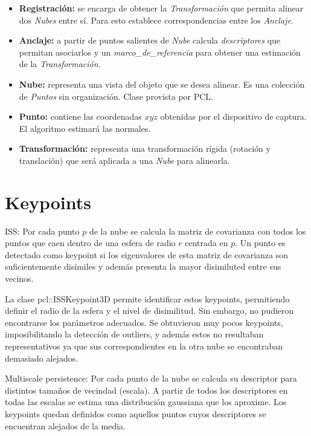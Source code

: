 		\begin{itemize}
			\item {\bfseries Registración:} se encarga de obtener la \emph{Transformación} que
				permita alinear dos \emph{Nubes} entre sí.  Para esto establece
				correspondencias entre los \emph{Anclaje}.
			\item {\bfseries Anclaje:} a partir de puntos salientes de \emph{Nube} calcula
				\emph{descriptores}  que permitan asociarlos y un
				\emph{marco\_de\_referencia} para obtener una estimación de la
				\emph{Transformación}.
			\item {\bfseries Nube:} representa una vista del objeto que se desea alinear.
				Es una colección de \emph{Puntos} sin organización. Clase
				provista por PCL.
			\item {\bfseries Punto:} contiene las coordenadas $xyz$ obtenidas por el
				dispositivo de captura. El algoritmo estimará las normales.
			\item {\bfseries Transformación:} representa una transformación rígida
				(rotación y translación) que será aplicada a una \emph{Nube}
				para alinearla.
		\end{itemize}

	\section{Keypoints}
		ISS:
		Por cada punto $p$ de la nube se calcula la matriz de covarianza con
		todos los puntos que caen dentro de una esfera de radio $r$ centrada en
		$p$.
		Un punto es detectado como keypoint si los eigenvalores de esta matriz
		de covarianza son suficientemente disímiles y además presenta la mayor disimiluted entre sus vecinos.

		La clase pcl::ISSKeypoint3D permite identificar estos keypoints, permitiendo definir el radio de la esfera y el nivel de disimilitud.
		Sin embargo, no pudieron encontrarse los parámetros adecuados.
		Se obtuvieron muy pocos keypoints, imposibilitando la detección de outliers,
		y además estos no resultaban representativos ya que sus correspondientes en la otra nube se encontraban demasiado alejados.

		Multiscale persistence:
		Por cada punto de la nube se calcula su descriptor para distintos tamaños de vecindad (escala).
		A partir de todos los descriptores en todas las escalas se estima una distribución gaussiana que los aproxime.
		Los keypoints quedan definidos como aquellos puntos cuyos descriptores se encuentran alejados de la media.

